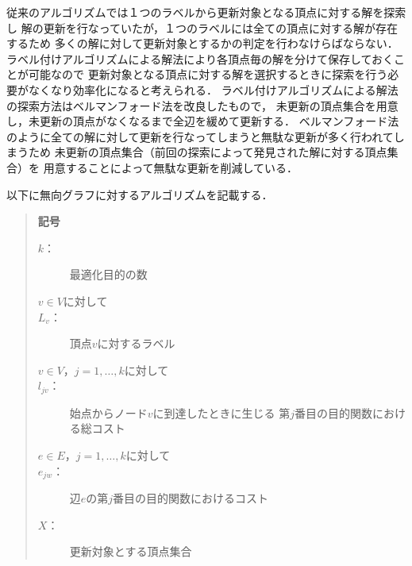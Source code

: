 \documentclass[12pt]{optlab-bachelor}
\begin{document}
従来のアルゴリズムでは１つのラベルから更新対象となる頂点に対する解を探索し
解の更新を行なっていたが，１つのラベルには全ての頂点に対する解が存在するため
多くの解に対して更新対象とするかの判定を行わなけらばならない．
ラベル付けアルゴリズムによる解法により各頂点毎の解を分けて保存しておくことが可能なので
更新対象となる頂点に対する解を選択するときに探索を行う必要がなくなり効率化になると考えられる．
ラベル付けアルゴリズムによる解法の探索方法はベルマンフォード法を改良したもので，
未更新の頂点集合を用意し，未更新の頂点がなくなるまで全辺を緩めて更新する．
ベルマンフォード法のように全ての解に対して更新を行なってしまうと無駄な更新が多く行われてしまうため
未更新の頂点集合（前回の探索によって発見された解に対する頂点集合）を
用意することによって無駄な更新を削減している．


以下に無向グラフに対するアルゴリズムを記載する．

\begin{quote}
  \textbf{記号}
  \begin{description}
    \item[$k$：] 最適化目的の数
    \item[$v \in V$に対して]
    \item[$L_v$：] 頂点$v$に対するラベル
    \item[$v \in V$，$j = 1 , \ldots , k$に対して]
    \item[$l_{jv}$：] 始点からノード$v$に到達したときに生じる
    第$j$番目の目的関数における総コスト
    \item[$e \in E$，$j = 1 , \ldots , k$に対して]
    \item[$e_{jw}$：] 辺$e$の第$j$番目の目的関数におけるコスト
    \item[$X$：] 更新対象とする頂点集合
  \end{description}
\end{quote}
\end{document}
